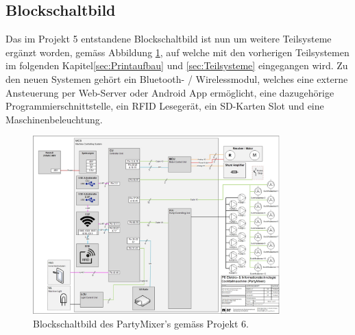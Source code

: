 \subsection{Blockschaltbild}
\label{subsec:Blockschaldbild}

Das im Projekt 5 entstandene Blockschaltbild ist nun um weitere Teilsysteme ergänzt worden, gemäss Abbildung \ref{fig:Blockschaltbild_Partymixer}, auf welche mit den vorherigen Teilsystemen im folgenden Kapitel\ref{sec:Printaufbau} und \ref{sec:Teilsysteme} eingegangen wird. Zu den neuen Systemen gehört ein Bluetooth- / Wirelessmodul, welches eine externe Ansteuerung per Web-Server oder Android App ermöglicht, eine dazugehörige Programmierschnittstelle, ein RFID Lesegerät, ein SD-Karten Slot und eine Maschinenbeleuchtung.

\begin{figure}[h!]
\center
\includegraphics[angle=90, width = 0.85\textwidth]{graphics/Blockschaltbild}
\caption{Blockschaltbild des PartyMixer's gemäss Projekt 6.}
\label{fig:Blockschaltbild_Partymixer}
\end{figure}


\newpage

